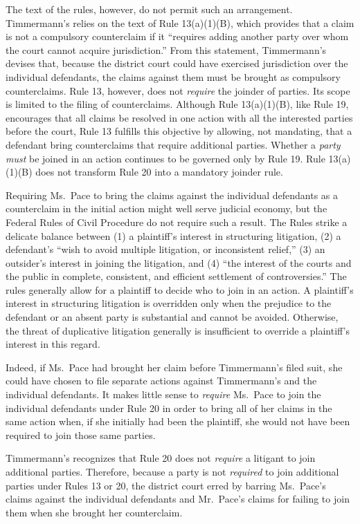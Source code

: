 \documentclass[11pt,letterpaper,twoside]{article}
\begin{document}
The text of the rules, however, do not permit such an arrangement.
Timmermann's relies on the text of Rule 13(a)(1)(B), which provides that
a claim is not a compulsory counterclaim if it ``requires adding another
party over whom the court cannot acquire jurisdiction.'' From this
statement, Timmermann's devises that, because the district court could
have exercised jurisdiction over the individual defendants, the claims
against them must be brought as compulsory counterclaims. Rule 13,
however, does not \emph{require} the joinder of parties. Its scope is
limited to the filing of counterclaims. Although Rule 13(a)(1)(B), like
Rule 19, encourages that all claims be resolved in one action with all
the interested parties before the court, Rule 13 fulfills this objective
by allowing, not mandating, that a defendant bring counterclaims that
require additional parties. Whether a \emph{party must} be joined in an
action continues to be governed only by Rule 19. Rule 13(a)(1)(B) does
not transform Rule 20 into a mandatory joinder rule.

Requiring Ms.~Pace to bring the claims against the individual defendants
as a counterclaim in the initial action might well serve judicial
economy, but the Federal Rules of Civil Procedure do not require such a
result. The Rules strike a delicate balance between (1) a plaintiff's
interest in structuring litigation, (2) a defendant's ``wish to avoid
multiple litigation, or inconsistent relief,'' (3) an outsider's
interest in joining the litigation, and (4) ``the interest of the courts
and the public in complete, consistent, and efficient settlement of
controversies.'' The rules generally allow for a plaintiff to decide who
to join in an action. A plaintiff's interest in structuring litigation
is overridden only when the prejudice to the defendant or an absent
party is substantial and cannot be avoided. Otherwise, the threat of
duplicative litigation generally is insufficient to override a
plaintiff's interest in this regard.

Indeed, if Ms.~Pace had brought her claim before Timmermann's filed
suit, she could have chosen to file separate actions against
Timmermann's and the individual defendants. It makes little sense to
\emph{require} Ms.~Pace to join the individual defendants under Rule 20
in order to bring all of her claims in the same action when, if she
initially had been the plaintiff, she would not have been required to
join those same parties.

Timmermann's recognizes that Rule 20 does not \emph{require} a litigant
to join additional parties. Therefore, because a party is not
\emph{required} to join additional parties under Rules 13 or 20, the
district court erred by barring Ms.~Pace's claims against the individual
defendants and Mr.~Pace's claims for failing to join them when she
brought her counterclaim.
\end{document}
